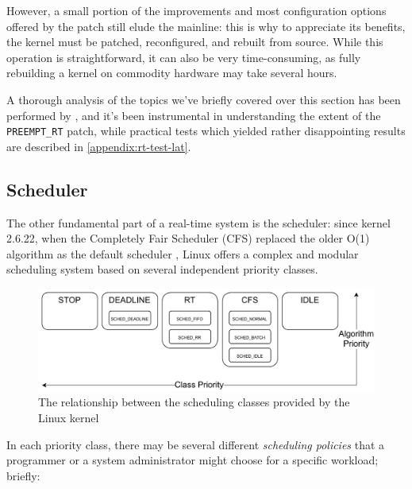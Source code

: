 \documentclass[a4paper,12pt]{report}
\begin{document}
However, a small portion of the improvements and most configuration options offered by the patch still elude the mainline: this is why to appreciate its benefits, the kernel must be patched, reconfigured, and rebuilt from source. While this operation is straightforward, it can also be very time-consuming, as fully rebuilding a kernel on commodity hardware may take several hours.

A thorough analysis of the topics we've briefly covered over this section has been performed by \textcite{survey-preempt-rt}, and it's been instrumental in understanding the extent of the \texttt{PREEMPT\_RT} patch, while practical tests which yielded rather disappointing results are described in \autoref{appendix:rt-test-lat}.

\subsection{Scheduler}

The other fundamental part of a real-time system is the scheduler: since kernel 2.6.22, when the Completely Fair Scheduler (CFS) replaced the older O(1) algorithm as the default scheduler \cite{lwn-cfs-merge}, Linux offers a complex and modular scheduling system based on several independent priority classes. 

\begin{figure}[H]
    \centering
    \includegraphics[width=\textwidth]{img/sched-class.pdf}
    \caption{The relationship between the scheduling classes provided by the Linux kernel}
\end{figure}

In each priority class, there may be several different \textit{scheduling policies} that a programmer or a system administrator might choose for a specific workload; briefly: 
\end{document}
